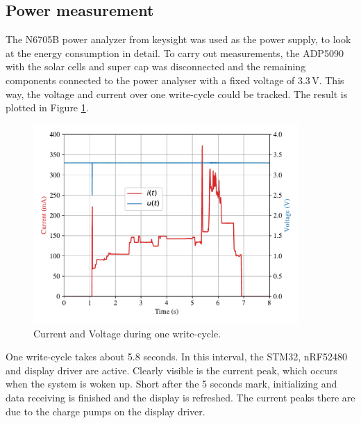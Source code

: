 \subsection{Power measurement}
The N6705B power analyzer from keysight was used as the power supply, to look at the energy consumption in detail.
To carry out measurements, the ADP5090 with the solar cells and super cap was disconnected and the remaining components connected to the power analyser with a fixed voltage of 3.3\,V.
This way, the voltage and current over one write-cycle could be tracked.
The result is plotted in Figure \ref{results:ui}.
\begin{figure}[ht]
	\centering
	\includegraphics[width=0.9\textwidth]{5-results/energy/logger/ui.pdf}
	\caption{Current and Voltage during one write-cycle.\label{results:ui}}
\end{figure}
One write-cycle takes about 5.8 seconds.
In this interval, the STM32, nRF52480 and display driver are active.
Clearly visible is the current peak, which occurs when the system is woken up.
Short after the 5 seconds mark, initializing and data receiving is finished and the display is refreshed.
The current peaks there are due to the charge pumps on the display driver.

